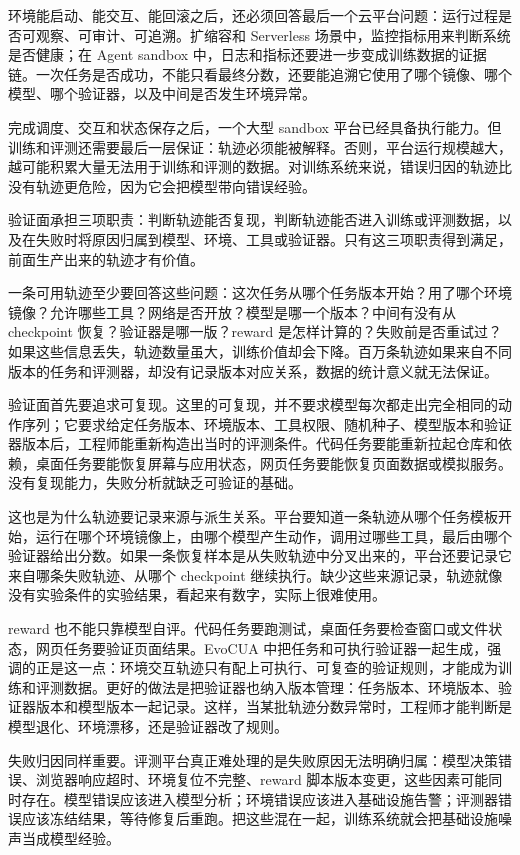 环境能启动、能交互、能回滚之后，还必须回答最后一个云平台问题：运行过程是否可观察、可审计、可追溯。扩缩容和 Serverless 场景中，监控指标用来判断系统是否健康；在 Agent sandbox 中，日志和指标还要进一步变成训练数据的证据链。一次任务是否成功，不能只看最终分数，还要能追溯它使用了哪个镜像、哪个模型、哪个验证器，以及中间是否发生环境异常。

完成调度、交互和状态保存之后，一个大型 sandbox 平台已经具备执行能力。但训练和评测还需要最后一层保证：轨迹必须能被解释。否则，平台运行规模越大，越可能积累大量无法用于训练和评测的数据。对训练系统来说，错误归因的轨迹比没有轨迹更危险，因为它会把模型带向错误经验。

验证面承担三项职责：判断轨迹能否复现，判断轨迹能否进入训练或评测数据，以及在失败时将原因归属到模型、环境、工具或验证器。只有这三项职责得到满足，前面生产出来的轨迹才有价值。

一条可用轨迹至少要回答这些问题：这次任务从哪个任务版本开始？用了哪个环境镜像？允许哪些工具？网络是否开放？模型是哪一个版本？中间有没有从 checkpoint 恢复？验证器是哪一版？reward 是怎样计算的？失败前是否重试过？如果这些信息丢失，轨迹数量虽大，训练价值却会下降。百万条轨迹如果来自不同版本的任务和评测器，却没有记录版本对应关系，数据的统计意义就无法保证。

验证面首先要追求可复现。这里的可复现，并不要求模型每次都走出完全相同的动作序列；它要求给定任务版本、环境版本、工具权限、随机种子、模型版本和验证器版本后，工程师能重新构造出当时的评测条件。代码任务要能重新拉起仓库和依赖，桌面任务要能恢复屏幕与应用状态，网页任务要能恢复页面数据或模拟服务。没有复现能力，失败分析就缺乏可验证的基础。

这也是为什么轨迹要记录来源与派生关系。平台要知道一条轨迹从哪个任务模板开始，运行在哪个环境镜像上，由哪个模型产生动作，调用过哪些工具，最后由哪个验证器给出分数。如果一条恢复样本是从失败轨迹中分叉出来的，平台还要记录它来自哪条失败轨迹、从哪个 checkpoint 继续执行。缺少这些来源记录，轨迹就像没有实验条件的实验结果，看起来有数字，实际上很难使用。

reward 也不能只靠模型自评。代码任务要跑测试，桌面任务要检查窗口或文件状态，网页任务要验证页面结果。EvoCUA 中把任务和可执行验证器一起生成，强调的正是这一点：环境交互轨迹只有配上可执行、可复查的验证规则，才能成为训练和评测数据。更好的做法是把验证器也纳入版本管理：任务版本、环境版本、验证器版本和模型版本一起记录。这样，当某批轨迹分数异常时，工程师才能判断是模型退化、环境漂移，还是验证器改了规则。

失败归因同样重要。评测平台真正难处理的是失败原因无法明确归属：模型决策错误、浏览器响应超时、环境复位不完整、reward 脚本版本变更，这些因素可能同时存在。模型错误应该进入模型分析；环境错误应该进入基础设施告警；评测器错误应该冻结结果，等待修复后重跑。把这些混在一起，训练系统就会把基础设施噪声当成模型经验。

